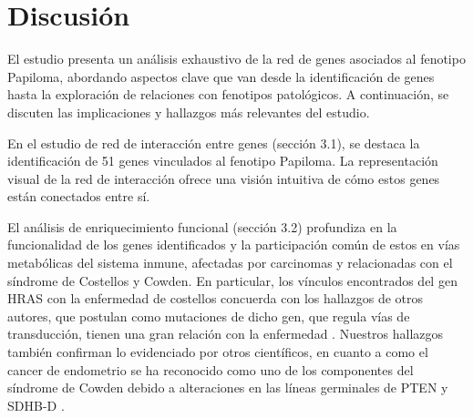 \section{Discusión}

El estudio presenta un análisis exhaustivo de la red de genes asociados al fenotipo Papiloma, abordando aspectos clave que van desde la identificación de genes hasta la exploración de relaciones con fenotipos patológicos. A continuación, se discuten las implicaciones y hallazgos más relevantes del estudio.

\vspace{3pt}

En el estudio de red de interacción entre genes (sección 3.1), se destaca la identificación de 51 genes vinculados al fenotipo Papiloma. La representación visual de la red de interacción ofrece una visión intuitiva de cómo estos genes están conectados entre sí.

\vspace{3pt}

El análisis de enriquecimiento funcional (sección 3.2) profundiza en la funcionalidad de los genes identificados y la participación común de estos en vías metabólicas del sistema inmune, afectadas por carcinomas y relacionadas con el síndrome de Costellos y Cowden.  En particular, los vínculos encontrados del gen HRAS con la enfermedad de costellos concuerda con los hallazgos de otros autores, que postulan como mutaciones de dicho gen, que regula vías de transducción, tienen una gran relación con la enfermedad \cite{Siegel2012}.  Nuestros hallazgos también confirman lo evidenciado por otros científicos, en cuanto a como el cancer de endometrio se ha reconocido como uno de los componentes del síndrome de Cowden debido a alteraciones en las líneas germinales de PTEN y SDHB-D \cite{Mahdi2015}.